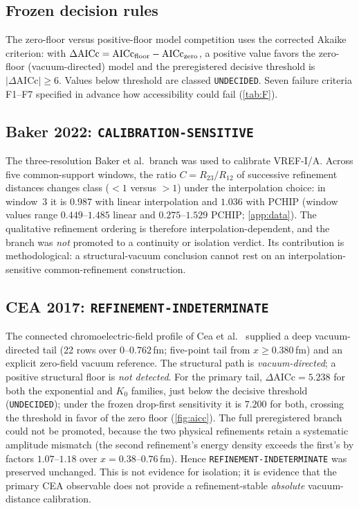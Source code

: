 \documentclass[11pt,a4paper]{article}
\theoremstyle{definition}
\theoremstyle{remark}
\begin{document}
\subsection{Frozen decision rules}
The zero-floor versus positive-floor model competition uses the corrected Akaike criterion: with $\Delta\mathrm{AICc}=\mathrm{AICc}_{\rm floor}-\mathrm{AICc}_{\rm zero}$, a positive value favors the zero-floor (vacuum-directed) model and the preregistered decisive threshold is $|\Delta\mathrm{AICc}|\ge6$. Values below threshold are classed \texttt{UNDECIDED}. Seven failure criteria F1--F7 specified in advance how accessibility could fail (\cref{tab:F}).

\subsection{Baker 2022: \texttt{CALIBRATION-\allowbreak{}SENSITIVE}}
The three-resolution Baker et al.\ branch \cite{Baker22} was used to calibrate VREF-I/A. Across five common-support windows, the ratio $C=R_{23}/R_{12}$ of successive refinement distances changes class ($<1$ versus $>1$) under the interpolation choice: in window~3 it is $0.987$ with linear interpolation and $1.036$ with PCHIP (window values range $0.449$--$1.485$ linear and $0.275$--$1.529$ PCHIP; \cref{app:data}). The qualitative refinement ordering is therefore interpolation-dependent, and the branch was \emph{not} promoted to a continuity or isolation verdict. Its contribution is methodological: a structural-vacuum conclusion cannot rest on an interpolation-sensitive common-refinement construction.

\subsection{CEA 2017: \texttt{REFINEMENT-\allowbreak{}INDETERMINATE}}
The connected chromoelectric-field profile of Cea et al.\ \cite{Cea17} supplied a deep vacuum-directed tail (22 rows over $0$--$0.762$\,fm; five-point tail from $x\ge0.380$\,fm) and an explicit zero-field vacuum reference. The structural path is \emph{vacuum-directed}; a positive structural floor is \emph{not detected}. For the primary tail, $\Delta\mathrm{AICc}=5.238$ for both the exponential and $K_0$ families, just below the decisive threshold (\texttt{UNDECIDED}); under the frozen drop-first sensitivity it is $7.200$ for both, crossing the threshold in favor of the zero floor (\cref{fig:aicc}). The full preregistered branch could not be promoted, because the two physical refinements retain a systematic amplitude mismatch (the second refinement's energy density exceeds the first's by factors $1.07$--$1.18$ over $x=0.38$--$0.76$\,fm). Hence \texttt{REFINEMENT-\allowbreak{}INDETERMINATE} was preserved unchanged. This is not evidence for isolation; it is evidence that the primary CEA observable does not provide a refinement-stable \emph{absolute} vacuum-distance calibration.
\end{document}
